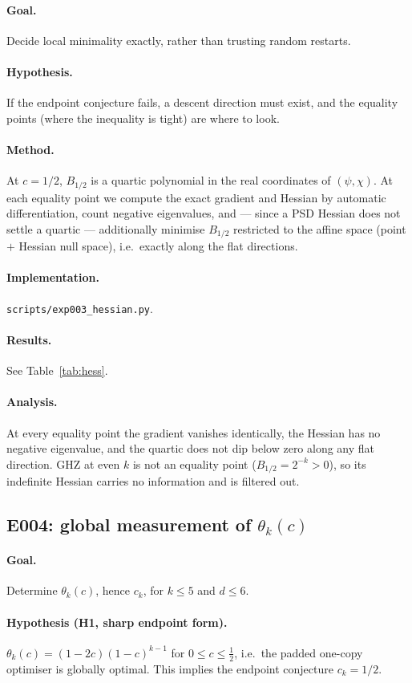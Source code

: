 \documentclass[11pt]{article}
\theoremstyle{definition}
\theoremstyle{plain}
\begin{document}
\paragraph{Goal.} Decide local minimality exactly, rather than trusting random restarts.
\paragraph{Hypothesis.} If the endpoint conjecture fails, a descent direction must exist,
and the equality points (where the inequality is tight) are where to look.
\paragraph{Method.} At $c=1/2$, $B_{1/2}$ is a quartic polynomial in the real coordinates of
$(\psi,\chi)$. At each equality point we compute the exact gradient and Hessian by
automatic differentiation, count negative eigenvalues, and --- since a PSD Hessian does not
settle a quartic --- additionally minimise $B_{1/2}$ restricted to the affine space
(point $+$ Hessian null space), i.e.\ exactly along the flat directions.
\paragraph{Implementation.} \texttt{scripts/exp003\_hessian.py}.
\paragraph{Results.} See Table~\ref{tab:hess}.
\paragraph{Analysis.} At every equality point the gradient vanishes identically, the
Hessian has no negative eigenvalue, and the quartic does not dip below zero along any flat
direction. GHZ at even $k$ is not an equality point ($B_{1/2}=2^{-k}>0$), so its indefinite
Hessian carries no information and is filtered out.

\subsection*{E004: global measurement of $\theta_k(c)$}
\paragraph{Goal.} Determine $\theta_k(c)$, hence $c_k$, for $k\le5$ and $d\le6$.
\paragraph{Hypothesis (H1, sharp endpoint form).} $\theta_k(c)=(1-2c)(1-c)^{k-1}$ for
$0\le c\le\tfrac12$, i.e.\ the padded one-copy optimiser is globally optimal. This implies
the endpoint conjecture $c_k=1/2$.
\end{document}
